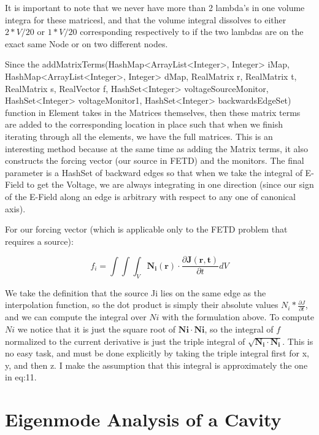 \documentclass[11pt,a4paper,oldfontcommands]{memoir}
\begin{document}
It is important to note that we never have more than 2 lambda’s in one volume integra for these matricesl, and that the volume integral dissolves to either $2*V/20$ or $1*V/20$ corresponding respectively to if the two lambdas are on the exact same Node or on two different nodes.

Since the addMatrixTerms(HashMap<ArrayList<Integer>, Integer> iMap, HashMap<ArrayList<Integer>, Integer> dMap, RealMatrix r, 
    		RealMatrix t, RealMatrix s, RealVector f, HashSet<Integer> voltageSourceMonitor, 
    		HashSet<Integer> voltageMonitor1, HashSet<Integer> backwardsEdgeSet) function in Element takes in the Matrices themselves, then these matrix terms are added to the corresponding location in place such that when we finish iterating through all the elements, we have the full matrices.
This is an interesting method because at the same time as adding the Matrix terms, it also constructs the forcing vector (our source in FETD) and the monitors. The final parameter is a HashSet of backward edges so that when we take the integral of E-Field to get the Voltage, we are always integrating in one direction (since our sign of the E-Field along an edge is arbitrary with respect to any one of canonical axis).

For our forcing vector (which is applicable only to the FETD problem that requires a source):

\begin{equation} \label{eq:forcing}
f_i = \int\int\int_{V} \mathbf{N_i (r)}\cdot \frac{\partial \mathbf{J(r, t)}}{\partial t} dV
\end{equation}

We take the definition that the source Ji lies on the same edge as the interpolation function, so the dot product is simply their absolute values $N_i*\frac{\partial J}{\partial t}$, and we can compute the integral over $Ni$ with the formulation above. To compute $Ni$ we notice that it is just the square root of $\mathbf{Ni} \cdot \mathbf{Ni}$, so the integral of $f$ normalized to the current derivative is just the triple integral of $\sqrt{\mathbf{N_i} \cdot \mathbf{N_i}}$. This is no easy task, and must be done explicitly by taking the triple integral first for x, y, and then z. I make the assumption that this integral is approximately the one in {eq:11}. 

\chapter{Eigenmode Analysis of a Cavity}
\end{document}
